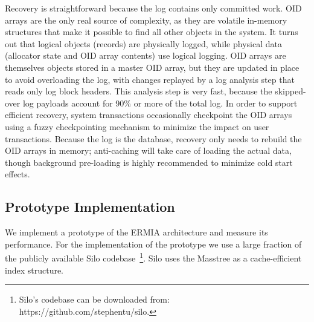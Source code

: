 Recovery is straightforward because the log contains only committed work. OID arrays are the only real source of complexity, as they are volatile in-memory structures that make it possible to find all other objects in the system. It turns out that logical objects (records) are physically logged, while physical data (allocator state and OID array contents) use logical logging.  OID arrays are themselves objects stored in a master OID array, but they are updated in place to avoid overloading the log, with changes replayed by a log analysis step that reads only log block headers. This analysis step is very fast, because the skipped-over log payloads account for 90\% or more of the total log. In order to support efficient recovery, system transactions occasionally checkpoint the OID arrays using a fuzzy checkpointing mechanism to minimize the impact on user transactions. Because the log is the database, recovery only needs to rebuild the OID arrays in memory; anti-caching will take care of loading the actual data, though background pre-loading is highly recommended to minimize cold start effects.

\subsection{Prototype Implementation}

We implement a prototype of the ERMIA architecture and measure its performance.  For the implementation of the prototype we use a large fraction of the publicly available Silo codebase~\footnote{Silo's codebase can be downloaded from: https://github.com/stephentu/silo.}.  Silo uses the Masstree \cite{MaoKM12} as a cache-efficient index structure. 
